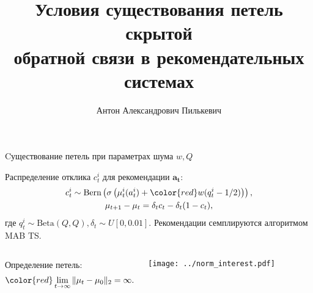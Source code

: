 \documentclass{beamer}
\title[\hbox to 56mm{Петли скрытой обратной связи}]{ Условия существования петель скрытой \\ обратной связи в рекомендательных системах }
\author[А.\,А. Пилькевич]{Антон Александрович Пилькевич}
\institute{Московский физико-технический институт}
\date{\footnotesize
\par\smallskip\emph{Курс:} Автоматизация научных исследований\par (практика, В.\,В.~Стрижов)/Группа 813
\par\smallskip\emph{Эксперт:} А.\,С.~Хританков
\par\smallskip\emph{Консультант:} А.\,С.~Хританков
\par\bigskip\small 2021}
\begin{document}
\begin{frame}
\thispagestyle{empty}
\maketitle
\end{frame}
\begin{frame}{Cуществование петель при параметрах шума $w, Q$}

Распределение отклика $c_t^i$ для рекомендации $\mathbf{a_t}$:
\begin{gather*}
  c_t^i \sim \text{Bern} \left(\sigma\left( \mu_t^i (a_t^i) + \mathbin{\color{red}w (q_t^i -1/2)} \right) \right), \\ 
\mu_{t+1} - \mu_{t} = \delta_t c_t - \delta_t (1 - c_t), 
\end{gather*}
где $q_t^i \sim \text{Beta}(Q, Q), \delta_t \sim U[0, 0.01].$
Рекомендации семплируются алгоритмом MAB TS.

\begin{columns}[c]
Определение петель: 
\begin{gather*}
  \color{red} \lim_{t \to \infty} \|\mu_t - \mu_0 \|_2 = \infty.
\end{gather*}
\begin{center}
  \texttt{[image: ../norm\_interest.pdf]}
\end{center}
\end{columns}
\end{frame}
\end{document}
